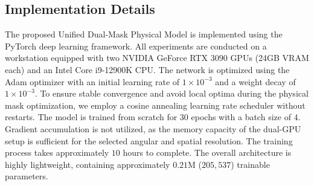 \documentclass[lettersize,journal]{IEEEtran}
\begin{document}
\begin{table}[htbp]
  \centering
  \caption{Summary of the light field datasets utilized for evaluating the proposed Unified Dual-Mask Physical Model.}
  \label{tab:datasets}
\end{table}

\subsection{Implementation Details}
The proposed Unified Dual-Mask Physical Model is implemented using the PyTorch deep learning framework. All experiments are conducted on a workstation equipped with two NVIDIA GeForce RTX 3090 GPUs (24GB VRAM each) and an Intel Core i9-12900K CPU. The network is optimized using the Adam optimizer  with an initial learning rate of $1 \times 10^{-3}$ and a weight decay of $1 \times 10^{-3}$. To ensure stable convergence and avoid local optima during the physical mask optimization, we employ a cosine annealing learning rate scheduler without restarts. The model is trained from scratch for $30$ epochs with a batch size of $4$. Gradient accumulation is not utilized, as the memory capacity of the dual-GPU setup is sufficient for the selected angular and spatial resolution. The training process takes approximately $10$ hours to complete. The overall architecture is highly lightweight, containing approximately $0.21$M ($205,537$) trainable parameters.
\end{document}
